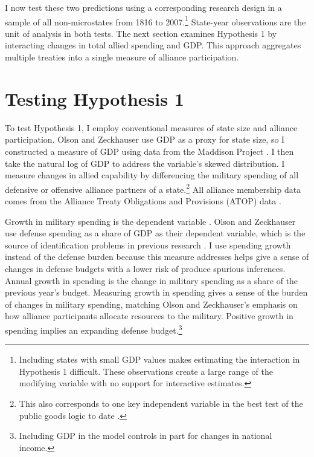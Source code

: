 \documentclass[12pt]{article}
\begin{document}
I now test these two predictions using a corresponding research design in a sample of all non-microstates from 1816 to 2007.\footnote{Including states with small GDP values makes estimating the interaction in Hypothesis 1 difficult. These observations create a large range of the modifying variable with no support for interactive estimates.}
State-year observations are the unit of analysis in both tests. 
The next section examines Hypothesis 1 by interacting changes in total allied spending and GDP.
This approach aggregates multiple treaties into a single measure of alliance participation. 


\section{Testing Hypothesis 1}

To test Hypothesis 1, I employ conventional measures of state size and alliance participation. 
Olson and Zeckhauser use GDP as a proxy for state size, so I constructed a measure of GDP using data from the Maddison Project \citep{Boltetal2018}. 
I then take the natural log of GDP to address the variable's skewed distribution. 
I measure changes in allied capability by differencing the military spending of all defensive or offensive alliance partners of a state.\footnote{This also corresponds to one key independent variable in the best test of the public goods logic to date \citep{PluemperNeumayer2015}.} 
All alliance membership data comes from the Alliance Treaty Obligations and Provisions (ATOP) data \citep{Leedsetal2002}.  


Growth in military spending is the dependent variable \citep{SingerCINC1988}. 
Olson and Zeckhauser use defense spending as a share of GDP as their dependent variable, which is the source of identification problems in previous research \citep{Kronmal1993, PluemperNeumayer2015}. 
I use spending growth instead of the defense burden because this measure addresses helps give a sense of changes in defense budgets with a lower risk of produce spurious inferences. 
Annual growth in spending is the change in military spending as a share of the previous year's budget. 
Measuring growth in spending gives a sense of the burden of changes in military spending, matching Olson and Zeckhauser's emphasis on how alliance participants allocate resources to the military.
Positive growth in spending implies an expanding defense budget.\footnote{Including GDP in the model controls in part for changes in national income.} 
\end{document}
